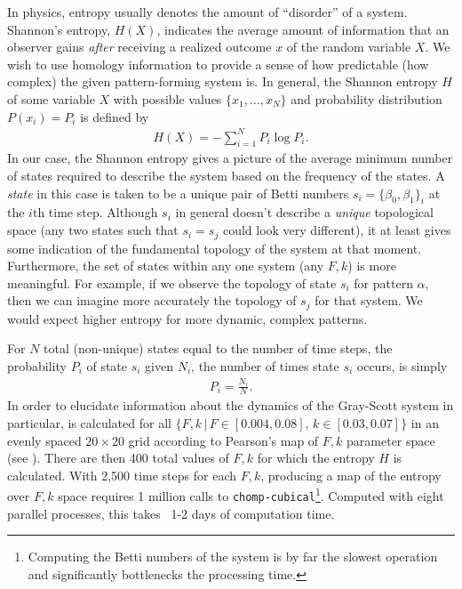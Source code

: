 In physics, entropy usually denotes the amount of ``disorder'' of a system. Shannon's entropy, $H(X)$, indicates the average amount of information that an observer gains \emph{after} receiving a realized outcome $x$ of the random variable $X$. We wish to use homology information to provide a sense of how predictable (how complex) the given pattern-forming system is. In general, the Shannon entropy $H$ of some variable $X$ with possible values $\{ x_1, \ldots, x_N \}$ and probability distribution $P(x_i) = P_i$ is defined by
\begin{align} \label{eq:shannon}
	H(X) = - \sum_{i=1}^{N} P_i \log{ P_i}.
\end{align}
In our case, the Shannon entropy gives a picture of the average minimum number of states required to describe the system based on the frequency of the states. A \emph{state} in this case is taken to be a unique pair of Betti numbers $s_i = \{ \beta_0, \beta_1 \}_i$ at the $i$th time step. Although $s_i$ in general doesn't describe a \emph{unique} topological space (any two states such that $s_i = s_j$ could look very different), it at least gives some indication of the fundamental topology of the system at that moment. Furthermore, the set of states within any one system (any $F, k$) is more meaningful. For example, if we observe the topology of state $s_i$ for pattern $\alpha$, then we can imagine more accurately the topology of $s_j$ for that system. We would expect higher entropy for more dynamic, complex patterns.

For $N$ total (non-unique) states equal to the number of time steps, the probability $P_i$ of state $s_i$ given $N_i$, the number of times state $s_i$ occurs, is simply
\begin{align} \label{eq:Pi}
	P_i = \frac{N_i}{N}.
\end{align}
In order to elucidate information about the dynamics of the Gray-Scott system in particular,  is calculated for all $\{ F, k \, | \, F \in [0.004, 0.08], \, k \in [0.03, 0.07] \}$ in an evenly spaced $20 \times 20$ grid according to Pearson's map of $F, k$ parameter space (see ). There are then 400 total values of $F,k$ for which the entropy $H$ is calculated. With 2,500 time steps for each $F,k$, producing a map of the entropy over $F,k$ space requires 1 million calls to \texttt{chomp-cubical}\footnote{Computing the Betti numbers of the system is by far the slowest operation and significantly bottlenecks the processing time.}. Computed with eight parallel processes, this takes ~1-2 days of computation time.


